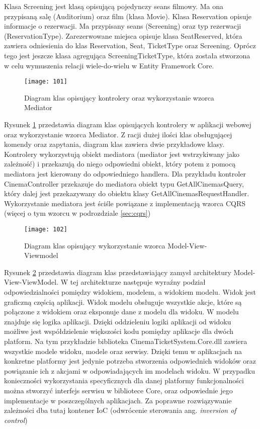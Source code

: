 Klasa Screening jest klasą opisującą pojedynczy seans filmowy. Ma ona przypisaną salę (Auditorium) oraz film (klasa Movie). Klasa Reservation opisuje informacje o rezerwacji. Ma przypisany seans (Screening) oraz typ rezerwacji (ReservationType). Zarezerwowane miejsca opisuje klasa SeatReserved, która zawiera odniesienia do klas Reservation, Seat, TicketType oraz Screening. Oprócz tego jest jeszcze klasa agregująca ScreeningTicketType, która została stworzona w celu wymuszenia relacji wiele-do-wielu w Entity Framework Core.
\newpage
\begin{figure}[h]
\centering
\texttt{[image: 101]}
\caption{Diagram klas opisujący kontrolery oraz wykorzystanie wzorca Mediator}
\label{klasy2}
\end{figure}
Rysunek \ref{klasy2} przedstawia diagram klas opisujących kontrolery w aplikacji webowej oraz wykorzystanie wzorca Mediator. Z racji dużej ilości klas obsługującej komendy oraz zapytania, diagram klas zawiera dwie przykładowe klasy. Kontrolery wykorzystują obiekt mediatora (mediator jest wstrzykiwany jako zależność) i przekazują do niego odpowiedni obiekt, który potem z pomocą mediatora jest kierowany do odpowiedniego handlera. Dla przykładu kontroler CinemaController przekazuje do mediatora obiekt typu GetAllCinemasQuery, który dalej jest przekazywany do obiektu klasy GetAllCinemasRequestHandler. Wykorzystanie mediatora jest ściśle powiązane z implementacją wzorca CQRS (więcej o tym wzorcu w podrozdziale \ref{sec:cqrs})
\newpage
\begin{figure}[h]
\centering
\texttt{[image: 102]}
\caption{Diagram klas opisujący wykorzystanie wzorca Model-View-Viewmodel}
\label{klasy3}
\end{figure}
Rysunek \ref{klasy3} przedstawia diagram klas przedstawiający zamysł architektury Model-View-ViewModel. W tej architekturze następuje wyraźny podział odpowiedzialności pomiędzy widokiem, modelem, a widokiem modelu. Widok jest graficzną częścią aplikacji. Widok modelu obsługuje wszystkie akcje, które są połączone z widokiem oraz eksponuje dane z modelu dla widoku. W modelu znajduje się logika aplikacji. Dzięki oddzieleniu logiki aplikacji od widoku możliwe jest współdzielenie większości kodu pomiędzy aplikacje dla dwóch platform. Na tym przykładzie biblioteka CinemaTicketSystem.Core.dll zawiera wszystkie modele widoku, modele oraz serwisy. Dzięki temu w aplikacjach na konkretne platformy jest jedynie potrzeba stworzenia odpowiednich widoków oraz powiązanie ich z akcjami w odpowiadających im modelach widoku. W przypadku konieczności wykorzystania specyficznych dla danej platformy funkcjonalności można stworzyć interfejs serwisu w bibliotece Core, oraz odpowiednie jego implementacje w poszczególnych aplikacjach. Za poprawne rozwiązywanie zależności dba tutaj kontener IoC (odwrócenie sterowania ang. \textit{inversion of control})
